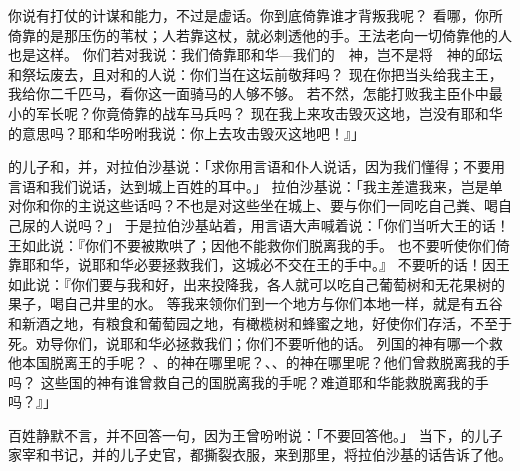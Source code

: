 {你说有打仗的计谋和能力，{}不过是虚话。你到底倚靠谁才背叛我呢？
看哪，你所倚靠的{}是那压伤的苇杖；人若靠这杖，就必刺透他的手。{}王法老向一切倚靠他的人也是这样。
你们若对我说：我们倚靠耶和华—我们的　神，{}岂不是将　神的邱坛和祭坛废去，且对{}和{}的人说：你们当在{}这坛前敬拜吗？
现在你把当头给我主{}王，我给你二千匹马，看你这一面骑马的人够不够。
若不然，怎能打败我主臣仆中最小的军长呢？你竟倚靠{}的战车马兵吗？
现在我上来攻击毁灭这地，岂没有耶和华的意思吗？耶和华吩咐我说：你上去攻击毁灭这地吧！』」
\par }{\PP {}的儿子{}和{}，并{}，对拉伯沙基说：「求你用{}言语和仆人说话，因为我们懂得；不要用{}言语和我们说话，达到城上百姓的耳中。」
拉伯沙基说：「我主差遣我来，岂是单对你和你的主说这些话吗？不也是对这些坐在城上、要与你们一同吃自己粪、喝自己尿的人说吗？」
于是拉伯沙基站着，用{}言语大声喊着说：「你们当听{}大王的话！
王如此说：『你们不要被{}欺哄了；因他不能救你们脱离我的手。
也不要听{}使你们倚靠耶和华，说耶和华必要拯救我们，这城必不交在{}王的手中。』
不要听{}的话！因{}王如此说：『你们要与我和好，出来投降我，各人就可以吃自己葡萄树和无花果树的果子，喝自己井里的水。
等我来领你们到一个地方与你们本地一样，就是有五谷和新酒之地，有粮食和葡萄园之地，有橄榄树和蜂蜜之地，好使你们存活，不至于死。{}劝导你们，说耶和华必拯救我们；你们不要听他的话。
列国的神有哪一个救他本国脱离{}王的手呢？
、{}的神在哪里呢？{}、{}、{}的神在哪里呢？他们曾救{}脱离我的手吗？
这些国的神有谁曾救自己的国脱离我的手呢？难道耶和华能救{}脱离我的手吗？』」
\par }{\PP {}百姓静默不言，并不回答一句，因为王曾吩咐说：「不要回答他。」
当下，{}的儿子家宰{}和书记{}，并{}的儿子史官{}，都撕裂衣服，来到{}那里，将拉伯沙基的话告诉了他。

}
